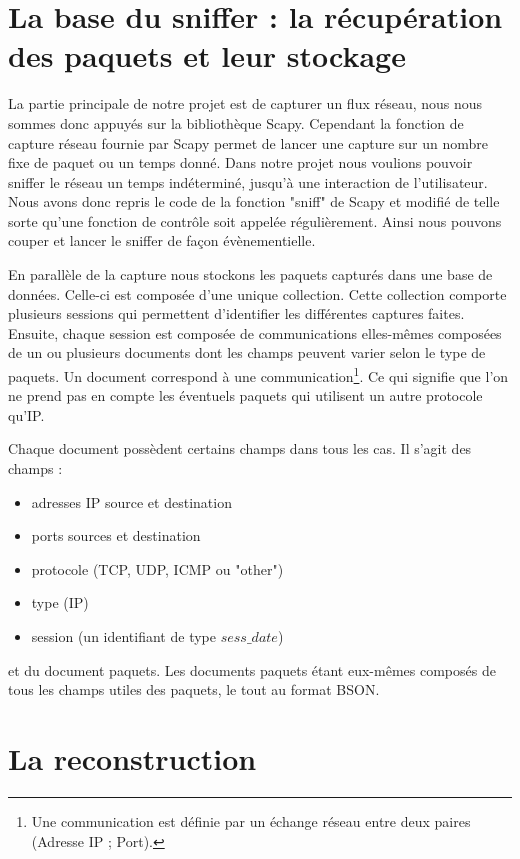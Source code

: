 \section{La base du sniffer : la récupération des paquets et leur stockage}

La partie principale de notre projet est de capturer un flux réseau, nous nous sommes donc appuyés sur la bibliothèque Scapy. Cependant la fonction de capture
réseau fournie par Scapy permet de lancer une capture sur un nombre fixe de paquet ou un temps donné. Dans notre projet nous voulions pouvoir sniffer
le réseau un temps indéterminé, jusqu'à une interaction de l'utilisateur. Nous avons donc repris le code de la fonction "sniff" de Scapy et modifié de telle sorte
qu'une fonction de contrôle soit appelée régulièrement. Ainsi nous pouvons couper et lancer le sniffer de façon évènementielle. 

En parallèle de la capture nous stockons les paquets capturés dans une base de données. Celle-ci est composée d'une unique collection. Cette collection comporte plusieurs sessions qui permettent d'identifier les différentes captures faites. Ensuite, chaque session est composée de communications elles-mêmes composées de un ou plusieurs documents dont les champs peuvent varier selon le type de paquets. Un document correspond à une communication\footnote{Une communication est définie par un échange réseau entre deux paires (Adresse IP ; Port).}. Ce qui signifie que l'on ne prend pas en compte les éventuels paquets qui utilisent un autre protocole qu'IP.

Chaque document possèdent certains champs dans tous les cas. Il s'agit des champs :
\begin{itemize}
\item adresses IP source et destination
\item ports sources et destination 
\item protocole (TCP, UDP, ICMP ou "other")
\item type (IP)
\item session (un identifiant de type $sess\_date$)
\end{itemize}

et du document paquets.
Les documents paquets étant eux-mêmes composés de tous les champs utiles des paquets, le tout au format BSON.



\section{La reconstruction}

